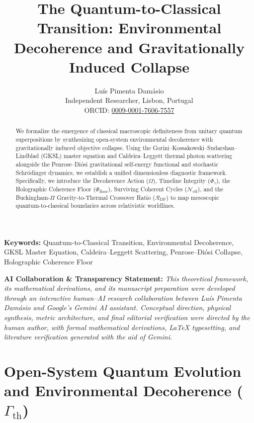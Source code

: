 \documentclass[11pt,a4paper]{article}
\title{\textbf{The Quantum-to-Classical Transition: Environmental Decoherence and Gravitationally Induced Collapse}}
\author{Luís {Pimenta Damásio}\\
\small Independent Researcher, Lisbon, Portugal\\
\small ORCID: \href{https://orcid.org/0009-0001-7606-7557}{0009-0001-7606-7557}}
\date{}
\begin{document}
\maketitle

\begin{abstract}
We formalize the emergence of classical macroscopic definiteness from unitary quantum superpositions by synthesizing open-system environmental decoherence with gravitationally induced objective collapse. Using the Gorini--Kossakowski--Sudarshan--Lindblad (GKSL) master equation and Caldeira--Leggett thermal photon scattering alongside the Penrose--Di\'osi gravitational self-energy functional and stochastic Schr\"odinger dynamics, we establish a unified dimensionless diagnostic framework. Specifically, we introduce the Decoherence Action ($\Omega$), Timeline Integrity ($\Phi_\tau$), the Holographic Coherence Floor ($\Phi_{\mathrm{floor}}$), Surviving Coherent Cycles ($\mathcal{N}_{\mathrm{eff}}$), and the Buckingham-$\Pi$ Gravity-to-Thermal Crossover Ratio ($\mathcal{R}_{\mathrm{DP}}$) to map mesoscopic quantum-to-classical boundaries across relativistic worldlines.
\end{abstract}

\noindent\textbf{Keywords:} Quantum-to-Classical Transition, Environmental Decoherence, GKSL Master Equation, Caldeira--Leggett Scattering, Penrose--Di\'osi Collapse, Holographic Coherence Floor

\vspace{0.8em}
\begin{mdframed}[backgroundcolor=gray!8,linecolor=gray!50,linewidth=0.8pt]
\small\textbf{AI Collaboration \& Transparency Statement:} \emph{This theoretical framework, its mathematical derivations, and its manuscript preparation were developed through an interactive human--AI research collaboration between Lu\'is Pimenta Dam\'asio and Google's Gemini AI assistant. Conceptual direction, physical synthesis, metric architecture, and final editorial verification were directed by the human author, with formal mathematical derivations, \LaTeX{} typesetting, and literature verification generated with the aid of Gemini.}
\end{mdframed}
\vspace{0.5em}

\section{Open-System Quantum Evolution and Environmental Decoherence (\texorpdfstring{$\Gamma_{\mathrm{th}}$}{Gamma\_th})}
\end{document}

